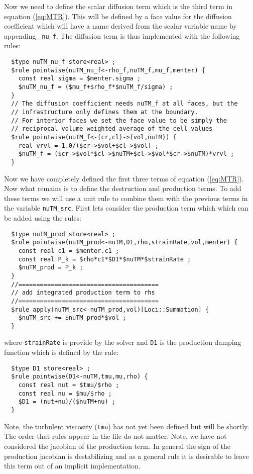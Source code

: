 \documentclass[letterpaper,twoside]{article}
\begin{document}
Now we need to define the scalar diffusion term which is the third
term in equation (\ref{eq:MTR}).  This will be defined by a face value
for the diffusion coefficient which will have a name derived from the
scalar variable name by appending {\tt \_nu\_f}.  The diffusion term
is thus implemented with the following rules:
\begin{verbatim}
  $type nuTM_nu_f store<real> ;
  $rule pointwise(nuTM_nu_f<-rho_f,nuTM_f,mu_f,menter) {
    const real sigma = $menter.sigma ;
    $nuTM_nu_f = ($mu_f+$rho_f*$nuTM_f/sigma) ;
  }
  // The diffusion coefficient needs nuTM_f at all faces, but the
  // infrastructure only defines them at the boundary.  
  // For interior faces we set the face value to be simply the 
  // reciprocal volume weighted average of the cell values
  $rule pointwise(nuTM_f<-(cr,cl)->(vol,nuTM)) {
    real vrvl = 1.0/($cr->$vol+$cl->$vol) ;
    $nuTM_f = ($cr->$vol*$cl->$nuTM+$cl->$vol*$cr->$nuTM)*vrvl ;
  }
\end{verbatim}
Now we have completely defined the first three terms of equation
(\ref{eq:MTR}).  Now what remains is to define the destruction and
production terms.  To add these terms we will use a unit rule to
combine them with the previous terms in the variable {\tt nuTM\_src}.
First lets consider the production term which which can be added using
the rules:
\begin{verbatim}
  $type nuTM_prod store<real> ;
  $rule pointwise(nuTM_prod<-nuTM,D1,rho,strainRate,vol,menter) {
    const real c1 = $menter.c1 ;
    const real P_k = $rho*c1*$D1*$nuTM*$strainRate ;
    $nuTM_prod = P_k ;
  }
  //=======================================
  // add integrated production term to rhs
  //=======================================
  $rule apply(nuTM_src<-nuTM_prod,vol)[Loci::Summation] {
    $nuTM_src += $nuTM_prod*$vol ;
  }
\end{verbatim}
where {\tt strainRate} is provide by the solver and {\tt D1} is the
production damping function which is defined by the rule:
\begin{verbatim}
  $type D1 store<real> ;
  $rule pointwise(D1<-nuTM,tmu,mu,rho) {
    const real nut = $tmu/$rho ;
    const real nu = $mu/$rho ;
    $D1 = (nut+nu)/($nuTM+nu) ;
  }
\end{verbatim}
Note, the turbulent viscosity ({\tt tmu}) has not yet been defined
but will be shortly.  The order that rules appear in the file do not
matter.  Note, we have not considered the jacobian of the production
term.  In general the sign of the production jacobian is destabilizing
and as a general rule it is desirable to leave this term out of an
implicit implementation.
\end{document}
